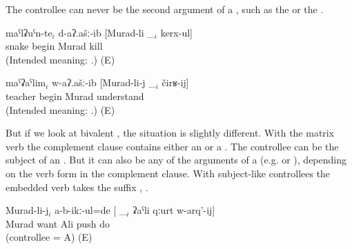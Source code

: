 The controllee can never be the second argument of a , such as the   or the  . 
%
\begin{exe}
	\ex	\label{ex:Snakes, Murad, teacher ungrammatical@43}
	\begin{xlist}
		\ex	\label{ex:The snakes began to be killed by Murad@43a}
		\gll	{*}	maˁlʡuˁn-te$_{i}$	d-aʔ.ašː-ib	[Murad-li	\_$_{i}$	kerx-ul]\\
			{}	snake	begin	Murad		kill\\
		\glt	(Intended meaning: .) (E)

		\ex	\label{ex:The teacher began to be understood by Murad@43bA}
		\gll	{*}	maˁʡaˁlim$_{i}$	w-aʔ.ašː-ib	[Murad-li-j	\_$_{i}$	čirʁ-ij]\\
			{}	teacher	begin	Murad		understand\\
		\glt	(Intended meaning: .) (E)
	\end{xlist}
\end{exe}

But if we look at bivalent , the situation is slightly different. With the matrix verb   the complement clause contains either an  or a . The controllee can be the subject of an  . But it can also be any of the arguments of a  (e.g.  or ), depending on the verb form in the complement clause. With subject-like controllees the embedded verb takes the  suffix , .
%
\begin{exe}
	\ex	\label{ex:Murad did not want to push Ali@44}
	\gll	Murad-li-j$_{i}$	a-b-ikː-ul=de	[ \_$_{i}$	ʡaˁli	qːurt	w-arq'-ij]\\
		Murad	want	{} 	Ali	push	do\\
	\glt	{} (controllee = A) (E)
\end{exe}


